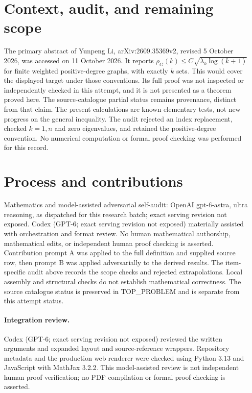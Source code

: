 \documentclass[11pt]{article}
\begin{document}
\section{Context, audit, and remaining scope}
The primary abstract of Yunpeng Li, arXiv:2609.35369v2, revised 5 October 2026,
was accessed on 11 October 2026. It reports
$\rho_G(k)\le C\sqrt{\lambda_k\log(k+1)}$ for finite weighted positive-degree
graphs, with exactly $k$ sets. This would cover the displayed target under
those conventions. Its full proof was not inspected or independently checked
in this attempt, and it is not presented as a theorem proved here.
The source-catalogue partial status remains provenance, distinct from that claim.
The present calculations are known elementary tests, not new progress on the
general inequality. The audit rejected an index replacement, checked $k=1,n$
and zero eigenvalues, and retained the positive-degree convention.
No numerical computation or formal proof checking was performed for this record.

\section{Process and contributions}
Mathematics and model-assisted adversarial self-audit: OpenAI gpt-6-astra, ultra reasoning, as dispatched for this research batch; exact serving revision not exposed. Codex (GPT-6; exact serving revision not exposed) materially assisted with orchestration and format review. No human mathematical authorship, mathematical edits, or independent human proof checking is asserted.
Contribution prompt A was applied to the full definition and supplied source row, then prompt B was applied adversarially to the derived results. The item-specific audit above records the scope checks and rejected extrapolations. Local assembly and structural checks do not establish mathematical correctness. The source catalogue status is preserved in TOP\_PROBLEM and is separate from this attempt status.
\paragraph{Integration review.} Codex (GPT-6; exact serving revision not exposed) reviewed the written arguments and expanded layout and source-reference wrappers. Repository metadata and the production web renderer were checked using Python 3.13 and JavaScript with MathJax 3.2.2. This model-assisted review is not independent human proof verification; no PDF compilation or formal proof checking is asserted.
\end{document}

